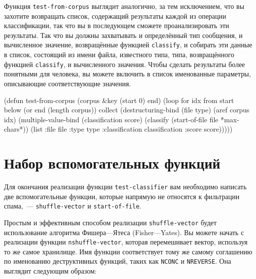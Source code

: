 Функция \lstinline{test-from-corpus} выглядит аналогично, за тем исключением, что вы захотите
возвращать список, содержащий результаты каждой из операции классификации, так что вы в
последующем сможете проанализировать эти результаты.  Так что вы должны захватывать и
определённый тип сообщения, и вычисленное значение, возвращённые функцией \lstinline{classify},
и собирать эти данные в список, состоящий из имени файла, известного типа, типа,
возвращённого функцией \lstinline{classify}, и вычисленного значения.  Чтобы сделать результаты
более понятными для человека, вы можете включить в список именованные параметры,
описывающие соответствующие значения.

\begin{myverb}
(defun test-from-corpus (corpus &key (start 0) end)
  (loop for idx from start below (or end (length corpus)) collect
        (destructuring-bind (file type) (aref corpus idx)
          (multiple-value-bind (classification score)
              (classify (start-of-file file *max-chars*))
            (list 
             :file file
             :type type
             :classification classification
             :score score)))))
\end{myverb}


\section{Набор вспомогательных функций}

Для окончания реализации функции \lstinline{test-classifier} вам необходимо написать две
вспомогательные функции, которые напрямую не относятся к фильтрации спама,~---
\lstinline{shuffle-vector} и \lstinline{start-of-file}.

Простым и эффективным способом реализации \lstinline{shuffle-vector} будет использование
алгоритма Фишера---Ятеса (Fisher---Yates).  Вы можете начать с реализации функции
  \lstinline{nshuffle-vector}, которая перемешивает вектор, используя то же самое хранилище.
  Имя функции соответствует тому же самому соглашению по именованию деструктивных функций,
  таких как \lstinline{NCONC} и \lstinline{NREVERSE}.  Она выглядит следующим образом:

